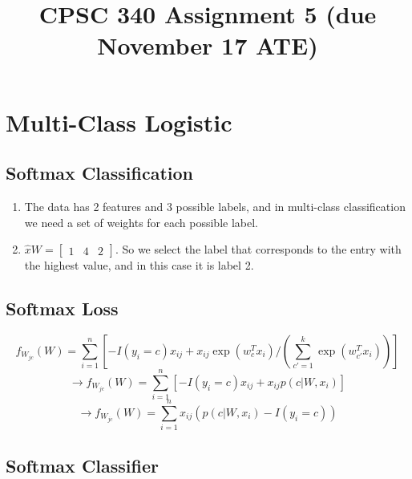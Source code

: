 \documentclass{article}
\def\enum#1{\begin{enumerate}#1\end{enumerate}}
\begin{document}
\title{CPSC 340 Assignment 5 (due November 17 ATE)}
\author{}
\date{}
\maketitle
\vspace{-4em}


\section{Multi-Class Logistic}

\subsection{Softmax Classification}

\enum{
\item The data has 2 features and 3 possible labels, and in multi-class classification we need a set of weights for each possible label.
\item $\hat{x} W =
\begin{bmatrix}
1 & 4 & 2
\end{bmatrix}$. So we select the label that corresponds to the entry with the highest value, and in this case it is label 2.
}

\subsection{Softmax Loss}

$$f_{W_{jc}}(W) = \sum_{i=1}^n \left[-I(y_i = c)x_{ij} + x_{ij}\exp(w_c^Tx_i)/\left(\sum_{c' = 1}^k \exp(w_{c'}^Tx_i)\right)\right]$$
$$\to f_{W_{jc}}(W) = \sum_{i=1}^n \left[-I(y_i = c)x_{ij} + x_{ij}p(c|W,x_i)\right]$$
$$\to f_{W_{jc}}(W) = \sum_{i=1}^n x_{ij}(p(c|W,x_i)-I(y_i = c))$$


\subsection{Softmax Classifier}
\end{document}
